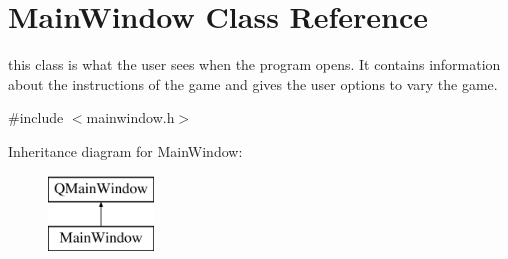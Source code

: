 \hypertarget{class_main_window}{}\section{Main\+Window Class Reference}
\label{class_main_window}


this class is what the user sees when the program opens. It contains information about the instructions of the game and gives the user options to vary the game.  




{\ttfamily \#include $<$mainwindow.\+h$>$}

Inheritance diagram for Main\+Window\+:\begin{figure}[H]
\begin{center}
\leavevmode
\includegraphics[height=2.000000cm]{class_main_window}
\end{center}
\end{figure}
